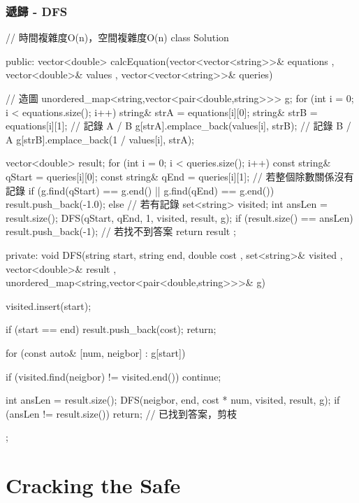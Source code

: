 \subsubsection{遞歸 - DFS}
\begin{Code}
// 時間複雜度O(n)，空間複雜度O(n)
class Solution {
public:
    vector<double> calcEquation(vector<vector<string>>& equations
                                , vector<double>& values
                                , vector<vector<string>>& queries){
        // 造圖
        unordered_map<string,vector<pair<double,string>>> g;
        for (int i = 0; i < equations.size(); i++)
        {
            string& strA = equations[i][0];
            string& strB = equations[i][1];
            // 記錄 A / B
            g[strA].emplace_back(values[i], strB);
            // 記錄 B / A
            g[strB].emplace_back(1 / values[i], strA);
        }

        vector<double> result;
        for (int i = 0; i < queries.size(); i++)
        {
            const string& qStart = queries[i][0];
            const string& qEnd = queries[i][1];
            // 若整個除數關係沒有記錄
            if (g.find(qStart) == g.end() || g.find(qEnd) == g.end())
                result.push_back(-1.0);
            else
            {
                // 若有記錄
                set<string> visited;
                int ansLen = result.size();
                DFS(qStart, qEnd, 1, visited, result, g);
                if (result.size() == ansLen)
                    result.push_back(-1); // 若找不到答案
            }
        }
        return result ;
    }
private:
    void DFS(string start, string end, double cost
             , set<string>& visited
             , vector<double>& result
             , unordered_map<string,vector<pair<double,string>>>& g)
    {
        visited.insert(start);

        if (start == end)
        {
            result.push_back(cost);
            return;
        }

        for (const auto& [num, neigbor] : g[start])
        {
            if (visited.find(neigbor) != visited.end()) continue;

            int ansLen = result.size();
            DFS(neigbor, end, cost * num, visited, result, g);
            if (ansLen != result.size()) return; // 已找到答案，剪枝
        }
    }
};
\end{Code}

\section{Cracking the Safe} %
\label{sec:cracking-the-safe}


